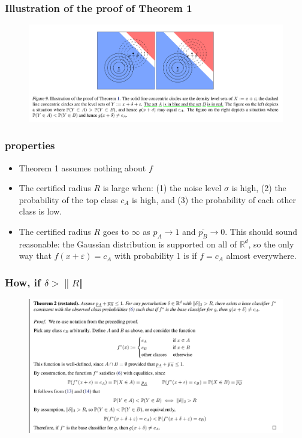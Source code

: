 \documentclass[aspectratio=169%
,serif,mathserif]{beamer}
\begin{document}
\begin{frame}
	\frametitle{Illustration of the proof of Theorem 1}
	\begin{figure}
		\includegraphics[width=0.9\linewidth]{3.png}
	\end{figure}
\end{frame}


\begin{frame}
	\frametitle{properties}
	\begin{itemize}
		\item Theorem 1 assumes nothing about $f$
		\item The certified radius $R$ is large when: (1) the noise level
		$\sigma$ is high, (2) the probability of the top class $c_A$ is high,
		and (3) the probability of each other class is low.
		\item The certified radius $R$ goes to $\infty$ as $p_{A} \rightarrow 1$ 
		and $\overline{p_{B}} \rightarrow 0 .$ This should sound reasonable: 
		the Gaussian distribution is supported on all of $\mathbb{R}^{d}$, so the only 
		way that $f(x+\varepsilon)=c_{A}$ with probability 1 is if $f=c_{A}$ almost everywhere.
	\end{itemize}
\end{frame}

\begin{frame}
	\frametitle{How, if $\delta > \| R \Vert$ } 
	\begin{figure}
		\includegraphics[width=0.8\linewidth]{6.png}
	\end{figure}
\end{frame}
\end{document}
